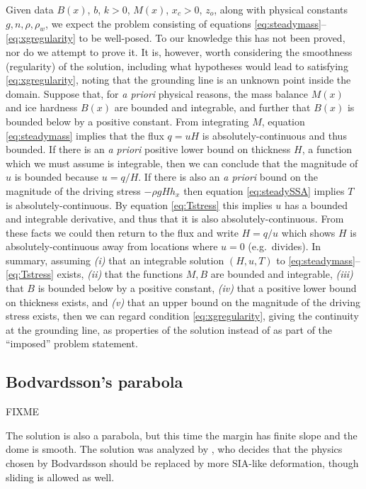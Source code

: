 \documentclass[twocolumn,letterpaper]{igs}
\begin{document}
Given data $B(x)$, $b$, $k>0$, $M(x)$, $x_c>0$, $z_o$, along with physical constants $g,n,\rho,\rho_w$, we expect the problem consisting of equations \eqref{eq:steadymass}--\eqref{eq:xgregularity} to be well-posed.  To our knowledge this has not been proved, nor do we attempt to prove it.  It is, however, worth considering the smoothness (regularity) of the solution, including what hypotheses would lead to satisfying \eqref{eq:xgregularity}, noting that the grounding line is an unknown point inside the domain.  Suppose that, for \emph{a priori} physical reasons, the mass balance $M(x)$ and ice hardness $B(x)$ are bounded and integrable, and further that $B(x)$ is bounded below by a positive constant.  From integrating $M$, equation \eqref{eq:steadymass} implies that the flux $q=uH$ is absolutely-continuous and thus bounded.  If there is an \emph{a priori} positive lower bound on thickness $H$, a function which we must assume is integrable, then we can conclude that the magnitude of $u$ is bounded because $u=q/H$.  If there is also an \emph{a priori} bound on the magnitude of the driving stress $-\rho g H h_x$ then equation \eqref{eq:steadySSA} implies $T$ is absolutely-continuous.  By equation \eqref{eq:Tstress} this implies $u$ has a bounded and integrable derivative, and thus that it is also absolutely-continuous.  From these facts we could then return to the flux and write $H=q/u$ which shows $H$ is absolutely-continuous away from locations where $u=0$ (e.g.~divides).  In summary, assuming \emph{(i)} that an integrable solution $(H,u,T)$ to \eqref{eq:steadymass}--\eqref{eq:Tstress} exists, \emph{(ii)} that the functions $M,B$ are bounded and integrable, \emph{(iii)} that $B$ is bounded below by a positive constant, \emph{(iv)} that a positive lower bound on thickness exists, and \emph{(v)} that an upper bound on the magnitude of the driving stress exists, then we can regard condition \eqref{eq:xgregularity}, giving the continuity at the grounding line, as properties of the solution instead of as part of the ``imposed'' problem statement.

\subsection*{Bodvardsson's parabola}

FIXME

The \cite{Bodvardsson} solution is also a parabola, but this time the margin has finite slope and the dome is smooth.  The \cite{Bodvardsson} solution was analyzed by \cite{Weertman61stability}, who decides that the physics chosen by Bodvardsson should be replaced by more SIA-like deformation, though sliding is allowed as well.
\end{document}

